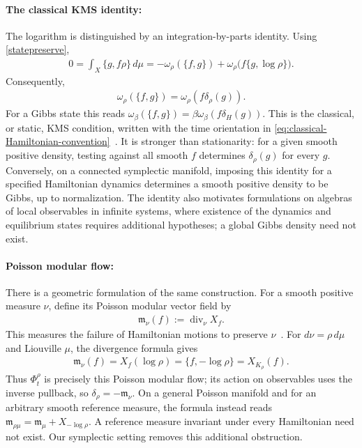 \documentclass[a4paper,11pt]{article}
\theoremstyle{definition}
\begin{document}
\paragraph{The classical KMS identity:}
The logarithm is distinguished by an integration-by-parts identity. Using \eqref{statepreserve},
\begin{align}
    0=\int_X\{g,f\rho\}\,d\mu
    =-\omega_\rho(\{f,g\})+
    \omega_\rho\bigl(f\{g,\log\rho\}\bigr).
\end{align}
Consequently,
\begin{align}\label{KMSclassical}
    \omega_\rho(\{f,g\})=\omega_\rho(f\delta_\rho(g)).
\end{align}
For a Gibbs state this reads $\omega_\beta(\{f,g\})=\beta\omega_\beta(f\delta_H(g))$. This is the classical, or static, KMS condition, written with the time orientation in \eqref{eq:classical-Hamiltonian-convention}~\cite{vanDeVen2022}. It is stronger than stationarity: for a given smooth positive density, testing against all smooth $f$ determines $\delta_\rho(g)$ for every $g$. Conversely, on a connected symplectic manifold, imposing this identity for a specified Hamiltonian dynamics determines a smooth positive density to be Gibbs, up to normalization. The identity also motivates formulations on algebras of local observables in infinite systems, where existence of the dynamics and equilibrium states requires additional hypotheses; a global Gibbs density need not exist.

\paragraph{Poisson modular flow:}
There is a geometric formulation of the same construction. For a smooth positive measure $\nu$, define its Poisson modular vector field by
\begin{align}
    \mathfrak m_\nu(f):=\operatorname{div}_\nu X_f.
\end{align}
This measures the failure of Hamiltonian motions to preserve $\nu$~\cite{Weinstein1997}. For $d\nu=\rho\,d\mu$ and Liouville $\mu$, the divergence formula gives
\begin{align}
    \mathfrak m_\nu(f)=X_f(\log\rho)
    =\{f,-\log\rho\}=X_{K_\rho}(f).
\end{align}
Thus $\Phi_t^\rho$ is precisely this Poisson modular flow; its action on observables uses the inverse pullback, so $\delta_\rho=-\mathfrak m_\nu$. On a general Poisson manifold and for an arbitrary smooth reference measure, the formula instead reads $\mathfrak m_{\rho\mu}=\mathfrak m_\mu+X_{-\log\rho}$. A reference measure invariant under every Hamiltonian need not exist. Our symplectic setting removes this additional obstruction.
\end{document}
